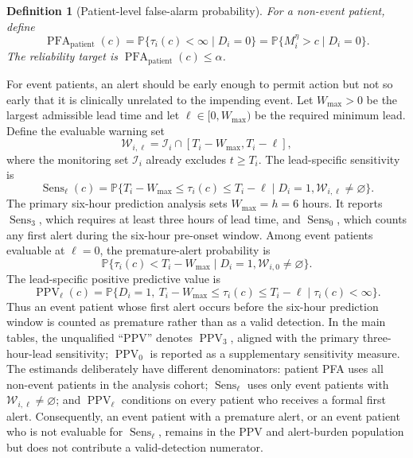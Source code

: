 \documentclass[11pt]{article}
\newtheorem{definition}{Definition}
\newcommand{\Pp}{\mathbb{P}}
\newcommand{\calI}{\mathcal{I}}
\newcommand{\calW}{\mathcal{W}}
\newcommand{\PFA}{\operatorname{PFA}}
\newcommand{\Sens}{\operatorname{Sens}}
\begin{document}
\begin{definition}[Patient-level false-alarm probability]
For a non-event patient, define
\begin{equation}
\PFA_{\mathrm{patient}}(c)
=\Pp\{\tau_i(c)<\infty\mid D_i=0\}
=\Pp\{M_i^{\eta}>c\mid D_i=0\}.
\label{eq:pfa}
\end{equation}
The reliability target is $\PFA_{\mathrm{patient}}(c)\le\alpha$.
\end{definition}

For event patients, an alert should be early enough to permit action but not so early that it is clinically unrelated to the impending event. Let $W_{\max}>0$ be the largest admissible lead time and let $\ell\in[0,W_{\max})$ be the required minimum lead. Define the evaluable warning set
\begin{equation}
\calW_{i,\ell}=\calI_i\cap[T_i-W_{\max},T_i-\ell],
\label{eq:evaluable-window}
\end{equation}
where the monitoring set $\calI_i$ already excludes $t\ge T_i$. The lead-specific sensitivity is
\begin{equation}
\Sens_{\ell}(c)=
\Pp\{T_i-W_{\max}\le\tau_i(c)\le T_i-\ell
\mid D_i=1,\calW_{i,\ell}\ne\varnothing\}.
\label{eq:lead-sensitivity}
\end{equation}
The primary six-hour prediction analysis sets $W_{\max}=h=6$ hours. It reports $\Sens_3$, which requires at least three hours of lead time, and $\Sens_0$, which counts any first alert during the six-hour pre-onset window. Among event patients evaluable at $\ell=0$, the premature-alert probability is
\begin{equation}
\Pp\{\tau_i(c)<T_i-W_{\max}\mid D_i=1,
\calW_{i,0}\ne\varnothing\}.
\label{eq:premature}
\end{equation}
The lead-specific positive predictive value is
\begin{equation}
\operatorname{PPV}_{\ell}(c)=
\Pp\{D_i=1,\ T_i-W_{\max}\le\tau_i(c)\le T_i-\ell
\mid \tau_i(c)<\infty\}.
\label{eq:lead-ppv}
\end{equation}
Thus an event patient whose first alert occurs before the six-hour prediction window is counted as premature rather than as a valid detection. In the main tables, the unqualified ``PPV'' denotes $\operatorname{PPV}_3$, aligned with the primary three-hour-lead sensitivity; $\operatorname{PPV}_0$ is reported as a supplementary sensitivity measure. The estimands deliberately have different denominators: patient PFA uses all non-event patients in the analysis cohort; $\Sens_{\ell}$ uses only event patients with $\calW_{i,\ell}\ne\varnothing$; and $\operatorname{PPV}_{\ell}$ conditions on every patient who receives a formal first alert. Consequently, an event patient with a premature alert, or an event patient who is not evaluable for $\Sens_{\ell}$, remains in the PPV and alert-burden population but does not contribute a valid-detection numerator.
\end{document}
